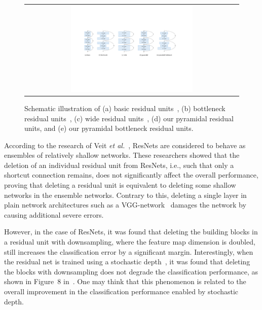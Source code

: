 \documentclass[10pt,twocolumn,letterpaper]{article}
\begin{document}
\begin{figure}[ht]
\small
\centering
\begin{tabular}{c}
\includegraphics[width=170mm, height=45mm]{Images2/pyramid2.pdf}
\end{tabular}
\caption{Schematic illustration of (a) basic residual units~\cite{resnet}, (b) bottleneck residual units~\cite{resnet}, (c) wide residual units~\cite{wideresnet}, (d) our pyramidal residual units, and (e) our pyramidal bottleneck residual units.}
\label{fig:pyramid}
\end{figure}

According to the research of Veit {\it et al.}~\cite{ensemble}, ResNets are considered to behave as ensembles of relatively shallow networks. These researchers showed that the deletion of an individual residual unit from ResNets, i.e., such that only a shortcut connection remains, does not significantly affect the overall performance, proving that deleting a residual unit is equivalent to deleting some shallow networks in the ensemble networks. Contrary to this, deleting a single layer in plain network architectures such as a VGG-network~\cite{VGG} damages the network by causing additional severe errors.

However, in the case of ResNets, it was found that deleting the building blocks in a residual unit with downsampling, where the feature map dimension is doubled, still increases the classification error by a significant margin. Interestingly, when the residual net is trained using a stochastic depth~\cite{stochasticdepth}, it was found that deleting the blocks with downsampling does not degrade the classification performance, as shown in Figure~8 in~\cite{ensemble}. One may think that this phenomenon is related to the overall improvement in the classification performance enabled by stochastic depth.
\end{document}
